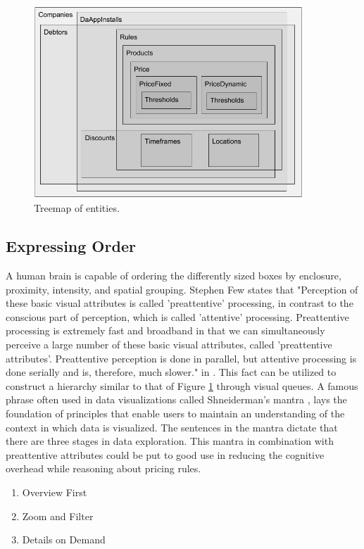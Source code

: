 \begin{figure}[H]
	\centering
	\includegraphics[width=0.9\textwidth]{Treemap}
	\caption[Treemap of Components]{Treemap of entities.}
	\label{fig:Treemap}
\end{figure}

\subsection{Expressing Order}
A human brain is capable of ordering the differently sized boxes by enclosure, proximity, intensity, and spatial grouping. Stephen Few states that "Perception of these basic visual attributes is called 'preattentive' processing, in contrast to the conscious part of perception, which is called 'attentive' processing. Preattentive processing is extremely fast and broadband in that we can simultaneously perceive a large number of these basic visual attributes, called 'preattentive attributes'. Preattentive perception is done in parallel, but attentive processing is done serially and is, therefore, much slower." in \cite[p.~3]{few}. This fact can be utilized to construct a hierarchy similar to that of Figure \ref{fig:Treemap} through visual queues. A famous phrase often used in data visualizations called Shneiderman's mantra \cite{mantra}, lays the foundation of principles that enable users to maintain an understanding of the context in which data is visualized. The sentences in the mantra dictate that there are three stages in data exploration. This mantra in combination with preattentive attributes could be put to good use in reducing the cognitive overhead while reasoning about pricing rules.

\begin{enumerate}
	\item Overview First
	\item Zoom and Filter
	\item Details on Demand
\end{enumerate}

